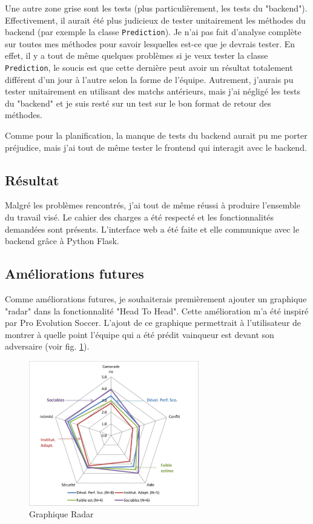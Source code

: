 \documentclass[a4paper,14pt]{extarticle}
\begin{document}
{Une autre zone grise sont les tests (plus particulièrement, les tests du "backend"). Effectivement, il aurait été plus judicieux de tester unitairement les méthodes du backend (par exemple la classe \texttt{Prediction}). Je n'ai pas fait d'analyse complète sur toutes mes méthodes pour savoir lesquelles est-ce que je devrais tester. En effet, il y a tout de même quelques problèmes si je veux tester la classe \texttt{Prediction}, le soucis est que cette dernière peut avoir un résultat totalement différent d'un jour à l'autre selon la forme de l'équipe. Autrement, j'aurais pu tester unitairement en utilisant des matchs antérieurs, mais j'ai négligé les tests du "backend" et je suis resté sur un test sur le bon format de retour des méthodes.

Comme pour la planification, la manque de tests du backend aurait pu me porter préjudice, mais j'ai tout de même tester le frontend qui interagit avec le backend.

\subsection{Résultat}

Malgré les problèmes rencontrés, j'ai tout de même réussi à produire l'ensemble du travail visé. Le cahier des charges a été respecté et les fonctionnalités demandées sont présents. L'interface web a été faite et elle communique avec le backend grâce à Python Flask.

\subsection{Améliorations futures}
Comme améliorations futures, je souhaiterais premièrement ajouter un graphique "radar" dans la fonctionnalité "Head To Head". Cette amélioration m'a été inspiré par Pro Evolution Soccer. L'ajout de ce graphique permettrait à l'utilisateur de montrer à quelle point l'équipe qui a été prédit vainqueur est devant son adversaire (voir fig. \ref{fig:graphRadar}).

\begin{figure}[htp]
    \centering
    \includegraphics[width=20em]{../img/graphRadar.png}
    \caption{Graphique Radar}
    \label{fig:graphRadar}
\end{figure}

}
\end{document}
